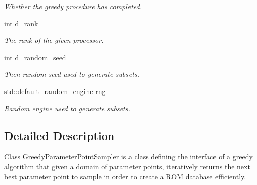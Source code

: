 \begin{DoxyCompactItemize}
\begin{DoxyCompactList}\small\item\em Whether the greedy procedure has completed. \end{DoxyCompactList}\item 
\hypertarget{class_c_a_r_o_m_1_1_greedy_parameter_point_sampler_a32ba575bccc1611d5510cce81af58e90}{int \hyperlink{class_c_a_r_o_m_1_1_greedy_parameter_point_sampler_a32ba575bccc1611d5510cce81af58e90}{d\-\_\-rank}}\label{class_c_a_r_o_m_1_1_greedy_parameter_point_sampler_a32ba575bccc1611d5510cce81af58e90}

\begin{DoxyCompactList}\small\item\em The rank of the given processor. \end{DoxyCompactList}\item 
\hypertarget{class_c_a_r_o_m_1_1_greedy_parameter_point_sampler_a51435395a2fa388c096b8f3db43178bd}{int \hyperlink{class_c_a_r_o_m_1_1_greedy_parameter_point_sampler_a51435395a2fa388c096b8f3db43178bd}{d\-\_\-random\-\_\-seed}}\label{class_c_a_r_o_m_1_1_greedy_parameter_point_sampler_a51435395a2fa388c096b8f3db43178bd}

\begin{DoxyCompactList}\small\item\em Then random seed used to generate subsets. \end{DoxyCompactList}\item 
\hypertarget{class_c_a_r_o_m_1_1_greedy_parameter_point_sampler_ab73040c124af2bd61d63f16698f8e36e}{std\-::default\-\_\-random\-\_\-engine \hyperlink{class_c_a_r_o_m_1_1_greedy_parameter_point_sampler_ab73040c124af2bd61d63f16698f8e36e}{rng}}\label{class_c_a_r_o_m_1_1_greedy_parameter_point_sampler_ab73040c124af2bd61d63f16698f8e36e}

\begin{DoxyCompactList}\small\item\em Random engine used to generate subsets. \end{DoxyCompactList}\end{DoxyCompactItemize}


\subsection{Detailed Description}
Class \hyperlink{class_c_a_r_o_m_1_1_greedy_parameter_point_sampler}{Greedy\-Parameter\-Point\-Sampler} is a class defining the interface of a greedy algorithm that given a domain of parameter points, iteratively returns the next best parameter point to sample in order to create a R\-O\-M database efficiently. 

